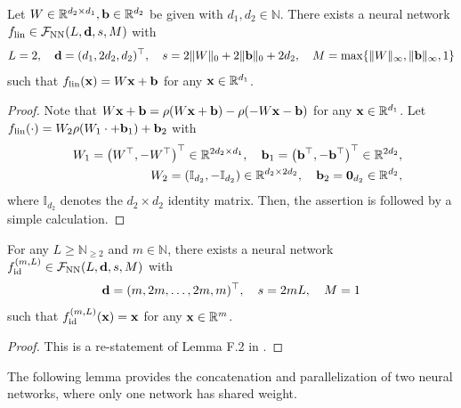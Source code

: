 \documentclass[twoside,11pt]{article}
\def\cF{\mathcal F}
\newcommand{\bb}{{\bf b}}
\newcommand{\bd}{{\bf d}}
\newcommand{\bx}{{\bf x}}
\newcommand{\bbI}{{\mathbb I}}
\newcommand{\bbR}{{\mathbb R}}
\newcommand{\bbN}{{\mathbb N}}
\newcommand{\bean}{\setlength\arraycolsep{1pt}\begin{eqnarray*}}
\newcommand{\eean}{\end{eqnarray*}}
\begin{document}
\begin{lemma}
\label{secnn:lin}
Let $W \in \bbR^{d_2 \times d_1}, \bb \in \bbR^{d_2}$ be given with $d_1,d_2 \in \bbN$. There exists a neural network $f_{\rm lin} \in \cF_{\rm NN}(L,\bd,s,M)$ with
\bean
L = 2, \quad \bd = (d_1,2d_2,d_2)^{\top}, \quad s = 2\|W\|_{0} + 2\|\bb\|_{0} + 2d_2, \quad M = \max\{ \|W\|_{\infty}, \|\bb\|_{\infty}, 1\}
\eean
such that $f_{\rm lin}(\bx) = W\bx + \bb$ for any $\bx \in \bbR^{d_1}$.
\end{lemma}
\begin{proof}
Note that $W\bx+ \bb = \rho(W\bx + \bb )-\rho(-W\bx - \bb)$ for any $\bx \in \bbR^{d_1}$. Let $f_{\rm lin}(\cdot) =  W_2 \rho ( W_1 \cdot + \bb_{1})  + \bb_2$ with
\bean
&&W_1 = \left(W^{\top}, -W^{\top} \right)^{\top} \in \bbR^{2d_2 \times d_1}, \quad \bb_{1} = \left(\bb^{\top} ,-\bb^{\top} \right)^{\top} \in \bbR^{2d_2},
\\
&& W_2 = \left(\bbI_{d_2}, -\bbI_{d_2} \right) \in \bbR^{d_2 \times 2d_2}, \quad \bb_{2} = \mathbf{0}_{d_2} \in \bbR^{d_2},
\eean
where $\bbI_{d_2}$ denotes the $d_2 \times d_2$ identity matrix. Then, the assertion is followed by a simple calculation.
\end{proof}


\begin{lemma}
\label{secnn:id}
For any $L \geq \bbN_{\geq 2}$ and $m \in \bbN$, there exists a neural network $f_{\rm id}^{(m,L)} \in \cF_{\rm NN}(L,\bd,s,M)$ with
\bean
\bd = (m,2m,\ldots,2m,m)^{\top}, \quad s = 2mL, \quad M = 1
\eean
such that $f_{\rm id}^{(m,L)}(\bx) = \bx$ for any $\bx \in \bbR^{m}$.
\end{lemma}
\begin{proof}
This is a re-statement of Lemma F.2 in \citet{oko2023diffusion}.
\end{proof}

\medskip

The following lemma provides the concatenation and parallelization of two neural networks, where only one network has shared weight.
\end{document}
